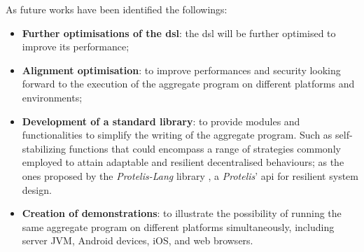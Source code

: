 As future works have been identified the followings:
\begin{itemize}
    \item \textbf{Further optimisations of the \ac{dsl}}: the \ac{dsl} will be further optimised to improve its performance;
    \item \textbf{Alignment optimisation}: to improve performances and security looking forward to the execution of the aggregate
        program on different platforms and environments;
    \item \textbf{Development of a standard library}: to provide modules and functionalities to simplify the writing of the aggregate program.
        Such as self-stabilizing functions that could encompass a range of strategies commonly employed to attain adaptable
        and resilient decentralised behaviours; as the ones proposed by the \emph{Protelis-Lang} library \cite{8064092},
        a \emph{Protelis}' \ac{api} for resilient system design.
    \item \textbf{Creation of demonstrations}: to illustrate the possibility of running the same aggregate program on
        different platforms simultaneously, including server JVM, Android devices, iOS, and web browsers.
\end{itemize}
